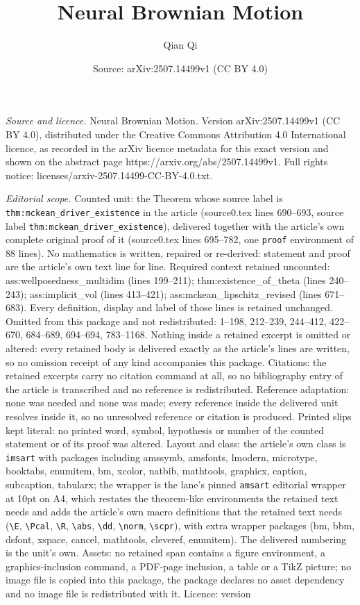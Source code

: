 \documentclass[10pt,a4paper]{amsart}
\title[Neural Brownian Motion]{Neural Brownian Motion}
\author{Qian Qi}
\date{Source: arXiv:2507.14499v1 (CC BY 4.0)}
\begin{document}
\maketitle

\noindent\emph{Source and licence.} Neural Brownian Motion. Version arXiv:2507.14499v1 (CC BY 4.0), distributed under the Creative Commons Attribution 4.0 International licence, as recorded in the arXiv licence metadata for this exact version and shown on the abstract page https://arxiv.org/abs/2507.14499v1. Full rights notice: licenses/arxiv-2507.14499-CC-BY-4.0.txt.\par\smallskip

\noindent\textit{Editorial scope.} Counted unit: the Theorem whose source label is \texttt{thm:mckean\_driver\_existence} in the article (source0.tex lines 690--693, source label \texttt{thm:mckean\_driver\_existence}), delivered together with the article's own complete original proof of it (source0.tex lines 695--782, one \texttt{proof} environment of 88 lines). No mathematics is written, repaired or re-derived: statement and proof are the article's own text line for line. Required context retained uncounted: ass:wellposedness\_multidim (lines 199--211); thm:existence\_of\_theta (lines 240--243); ass:implicit\_vol (lines 413--421); ass:mckean\_lipschitz\_revised (lines 671--683). Every definition, display and label of those lines is retained unchanged. Omitted from this package and not redistributed: 1--198, 212--239, 244--412, 422--670, 684--689, 694--694, 783--1168. Nothing inside a retained excerpt is omitted or altered: every retained body is delivered exactly as the article's lines are written, so no omission receipt of any kind accompanies this package. Citations: the retained excerpts carry no citation command at all, so no bibliography entry of the article is transcribed and no reference is redistributed. Reference adaptation: none was needed and none was made; every reference inside the delivered unit resolves inside it, so no unresolved reference or citation is produced. Printed slips kept literal: no printed word, symbol, hypothesis or number of the counted statement or of its proof was altered. Layout and class: the article's own class is \texttt{imsart} with packages including amssymb, amsfonts, lmodern, microtype, booktabs, enumitem, bm, xcolor, natbib, mathtools, graphicx, caption, subcaption, tabularx; the wrapper is the lane's pinned \texttt{amsart} editorial wrapper at 10pt on A4, which restates the theorem-like environments the retained text needs and adds the article's own macro definitions that the retained text needs (\texttt{\textbackslash E}, \texttt{\textbackslash Pcal}, \texttt{\textbackslash R}, \texttt{\textbackslash abs}, \texttt{\textbackslash dd}, \texttt{\textbackslash norm}, \texttt{\textbackslash scpr}), with extra wrapper packages (bm, bbm, dsfont, xspace, cancel, mathtools, cleveref, enumitem). The delivered numbering is the unit's own. Assets: no retained span contains a figure environment, a graphics-inclusion command, a PDF-page inclusion, a table or a TikZ picture; no image file is copied into this package, the package declares no asset dependency and no image file is redistributed with it. Licence: version 
\end{document}
